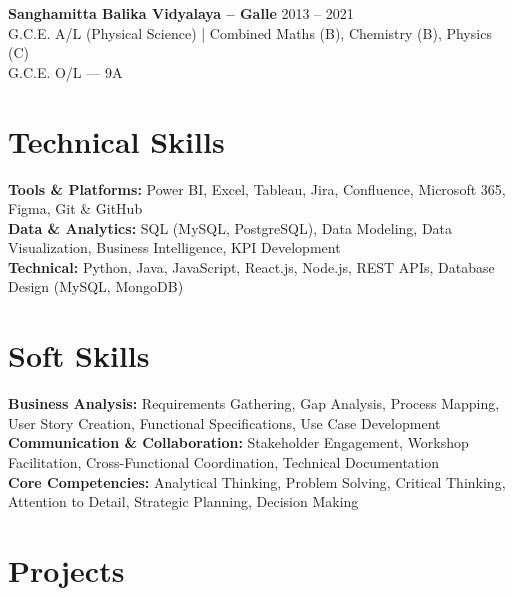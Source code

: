 \documentclass[letterpaper,10.8pt]{article}
\newenvironment{resume_list}{
  \vspace{-1pt}
  \begin{itemize}[itemsep=2pt, leftmargin=14pt]
}{
  \end{itemize}\vspace{-2pt}
}
\begin{document}
\vspace{2pt}
\noindent\textbf{Sanghamitta Balika Vidyalaya – Galle} \hfill 2013 – 2021\\
\noindent G.C.E. A/L (Physical Science) | Combined Maths (B), Chemistry (B), Physics (C)\\
\noindent G.C.E. O/L — 9A

\section{Technical Skills}
\vspace{-1pt}

\textbf{Tools \& Platforms:} Power BI, Excel, Tableau, Jira, Confluence, Microsoft 365, Figma, Git \& GitHub\\[4pt]
\textbf{Data \& Analytics:} SQL (MySQL, PostgreSQL), Data Modeling, Data Visualization, Business Intelligence, KPI Development\\[4pt]
\textbf{Technical:} Python, Java, JavaScript, React.js, Node.js, REST APIs, Database Design (MySQL, MongoDB)

\section{Soft Skills}
\vspace{-1pt}

\textbf{Business Analysis:} Requirements Gathering, Gap Analysis, Process Mapping, User Story Creation, Functional Specifications, Use Case Development\\[4pt]
\textbf{Communication \& Collaboration:} Stakeholder Engagement, Workshop Facilitation, Cross-Functional Coordination, Technical Documentation\\[4pt]
\textbf{Core Competencies:} Analytical Thinking, Problem Solving, Critical Thinking, Attention to Detail, Strategic Planning, Decision Making

\section{Projects}
\vspace{-2pt}

\newcommand{\project}[5]{%
  \noindent
  \makebox[0pt][l]{\faGithub}%
  \hspace{1.5em}\textbf{\href{#1}{#2}} \hfill #3\\[-1pt]
  \textit{#4}\\[-5pt]
  \begin{resume_list}
    #5
  \end{resume_list}
  \vspace{4pt}
}
\end{document}
